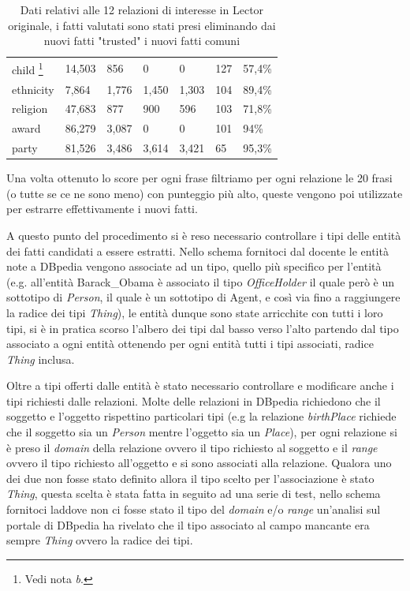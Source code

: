 \documentclass[10pt,a4paper,twocolumn]{article}
\begin{document}
\begin{table}[t]
\begin{minipage}{\textwidth}
\begin{tabular}{lllllll}
		child \footnote{Vedi nota \textit{b}.}                & 14,503               & 856                      & 0                          & 0            & 127        & 57,4\%     \\
		ethnicity            & 7,864                & 1,776                    & 1,450                      & 1,303        & 104        & 89,4\%     \\
		religion             & 47,683               & 877                      & 900                        & 596          & 103        & 71,8\%     \\
		award                & 86,279               & 3,087                    & 0                          & 0            & 101        & 94\%       \\
		party                & 81,526               & 3,486                    & 3,614                      & 3,421        & 65         & 95,3\%    
		\end{tabular}
	\end{minipage}
	\caption{Dati relativi alle 12 relazioni di interesse in Lector originale, i fatti valutati sono stati presi eliminando dai nuovi fatti "trusted" i nuovi fatti comuni}
	\label{dati}
\end{table}

Una volta ottenuto lo score per ogni frase filtriamo per ogni relazione le 20 frasi (o tutte se ce ne sono meno) con punteggio più alto, queste vengono poi utilizzate per estrarre effettivamente i nuovi fatti. 

A questo punto del procedimento si è reso necessario controllare i tipi delle entità dei fatti candidati a essere estratti. Nello schema fornitoci dal docente le entità note a DBpedia vengono associate ad un tipo, quello più specifico per l'entità (e.g. all'entità Barack\_Obama è associato il tipo \textit{OfficeHolder} il quale però è un sottotipo di \textit{Person}, il quale è un sottotipo di Agent, e così via fino a raggiungere la radice dei tipi \textit{Thing}), le entità dunque sono state arricchite con tutti i loro tipi, si è in pratica scorso l'albero dei tipi dal basso verso l'alto partendo dal tipo associato a ogni entità ottenendo per ogni entità tutti i tipi associati, radice \textit{Thing} inclusa.

Oltre a tipi offerti dalle entità è stato necessario controllare e modificare anche i tipi richiesti dalle relazioni. Molte delle relazioni in DBpedia richiedono che il soggetto e l'oggetto rispettino particolari tipi (e.g la relazione \textit{birthPlace} richiede che il soggetto sia un \textit{Person} mentre l'oggetto sia un \textit{Place}), per ogni relazione si è preso il \textit{domain} della relazione ovvero il tipo richiesto al soggetto e il \textit{range} ovvero il tipo richiesto all'oggetto e si sono associati alla relazione. Qualora uno dei due non fosse stato definito allora il tipo scelto per l'associazione è stato \textit{Thing}, questa scelta è stata fatta in seguito ad una serie di test, nello schema fornitoci laddove non ci fosse stato il tipo del \textit{domain} e/o \textit{range} un'analisi sul portale di DBpedia ha rivelato che il tipo associato al campo mancante era sempre \textit{Thing} ovvero la radice dei tipi.
\end{document}
